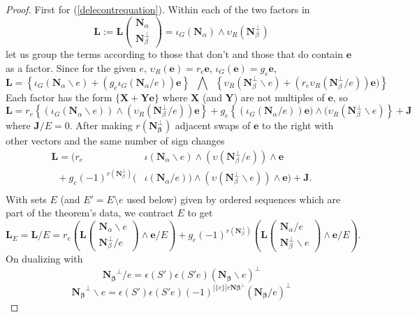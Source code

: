 \documentclass[Unicode]{cedram-alco}
\newcommand{\ext}[1]{\ensuremath{\mathbf{#1}}}
\newcommand{\eNal}{\ensuremath{\ext{N}_{\alpha}}}
\newcommand{\eNbePe}{\ensuremath{\ext{N}_{\beta}^{\perp}}}
\newcommand{\Is}{\ensuremath{\iota}}
\newcommand{\Vs}{\ensuremath{\upsilon}}
\begin{document}
\begin{proof}

First for (\ref{delecontrequation}). Within each of the two factors in
  \[
   \ext{L} := \ext{L}\left( \begin{array}{c} \eNal\\ \eNbePe \end{array} \right)
=\Is_G(\eNal)\wedge\Vs_R(\eNbePe)
  \]
let us group the terms according to those that don't and those that do
contain $\ext{e}$ as a factor.   Since for the given $e$, 
  $\Vs_R(\ext{e})=r_e\ext{e}$, $\Is_G(\ext{e})=g_e\ext{e}$,
\[
\ext{L} =
\left\{\Is_G(\eNal \backslash e) + (g_e\Is_G(\eNal/e))\ext{e}\right\}
\;\;\bigwedge\;\;
\left\{\Vs_R(\eNbePe\backslash e) + (r_e\Vs_R(\eNbePe/e))\ext{e})\right\}  
\]
Each factor has the form $\{\ext{X} + \ext{Y}\ext{e}\}$ where
$\ext{X}$ (and $\ext{Y}$) are not multiples of $\ext{e}$, so
\[
\ext{L}=
r_e\left\{ (\Is_G(\eNal\backslash e))\wedge (\Vs_R(\eNbePe/e))\ext{e} \right\}  +
g_e\left\{ (\Is_G(\eNal/e))\ext{e})  \wedge (\Vs_R(\eNbePe\backslash e)\right\}
+\ext{J}
\]
where $\ext{J}/E = 0$.
After making $r(\ext{N_\beta^\perp})$ adjacent swaps of $\ext{e}$ to the right with other
vectors and the same number of sign changes
\[
\begin{split} 
   \ext{L} = \Big( r_e  \;\;\; \;\;\;\;\;\;\;\;\;\;\;\;\;\; & \Is(\eNal\backslash e)  \wedge (\Vs(\eNbePe/e))      \wedge  \ext{e} \\
   \;\;+ g_e (-1)^{r(\eNbePe)} ( & \Is(\eNal/e))\wedge(\Vs(\eNbePe\backslash e))   \wedge  \ext{e}\Big)
+\ext{J}.\\
\end{split}
\]
With sets $E$ (and $E'=E\setminus e$ used below) given by ordered sequences
which are part of the theorem's data, we contract $E$ to get
\[
\ext{L}_E=\ext{L}/E = r_e\left(\ext{L}\left(\begin{array}{c} \eNal\backslash e \\
    \eNbePe/e  \end{array} \right)  \wedge \ext{e} /E \right) +
   g_e(-1)^{r(\eNbePe)}\left(\ext{L}\left(\begin{array}{c} \eNal /e \\
    \eNbePe \backslash e \end{array} \right) \wedge \ext{e} /E \right).
   \]
On dualizing with
   \[
     \ext{N_\beta}^\perp/e  = \epsilon(S')\epsilon(S'e) (\ext{N_\beta}\backslash e)^\perp
     \]
     \[
       \ext{N_\beta}^\perp\backslash e = \epsilon(S')\epsilon(S'e)(-1)^{|\{e\}|r\ext{N\beta}^\perp}(\ext{N_\beta}/e)^\perp
\]
\end{proof}
\end{document}
